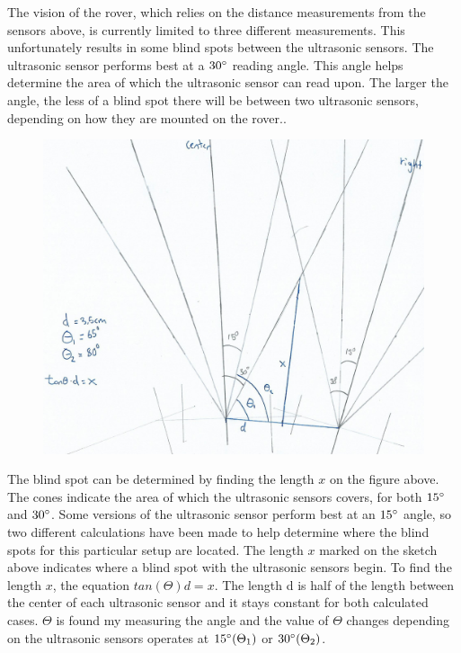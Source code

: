 
The vision of the rover, which relies on the distance measurements from the sensors above, is currently limited to three different measurements. This unfortunately results in some blind spots between the ultrasonic sensors.
The ultrasonic sensor performs best at a $30\degree$ reading angle. This angle helps determine the area of which the ultrasonic sensor can read upon. The larger the angle, the less of a blind spot there will be between two ultrasonic sensors, depending on how they are mounted on the rover.\cite{hcsr40datesheet}.

\clearpage
\begin{figure}[H]
	\centering
	\includegraphics[width=1\linewidth]{images/blindspot_calc.jpg}
\end{figure}

The blind spot can be determined by finding the length $x$ on the figure above. The cones indicate the area of which the ultrasonic sensors covers, for both $15\degree$ and $30\degree$. Some versions of the ultrasonic sensor perform best at an $15\degree$ angle, so two different calculations have been made to help determine where the blind spots for this particular setup are located.
The length $x$ marked on the sketch above indicates where a blind spot with the ultrasonic sensors begin. To find the length $x$, the equation $tan(\Theta)d = x$. The length d is half of the length between the center of each ultrasonic sensor and it stays constant for both calculated cases. $\Theta$ is found my measuring the angle and the value of $\Theta$ changes depending on the ultrasonic sensors operates at $15\degree (\Theta_1)$ or $30\degree (\Theta_2)$.

